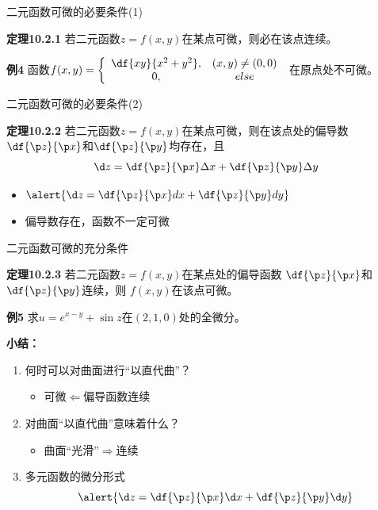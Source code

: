 \begin{frame}{二元函数可微的必要条件(1)}
	\linespread{1.2}
	\begin{block}{{\bf 定理10.2.1}\hfill}
		若二元函数$z=f(x,y)$在某点可微，则必在该点连续。
	\end{block}\pause 
	\begin{exampleblock}{{\bf 例4}\hfill}
		函数$f(x,y)=\left\{\begin{array}{cc}
			\df{xy}{x^2+y^2},& (x,y)\ne (0,0)\\
			0, & else
		\end{array}\right.$
		在原点处不可微。
	\end{exampleblock}
\end{frame}

\begin{frame}{二元函数可微的必要条件(2)}
	\linespread{1.2}
	\begin{block}{{\bf 定理10.2.2}\hfill}
		若二元函数$z=f(x,y)$在某点可微，则在该点处的偏导数
		$\df{\p z}{\p x}$和$\df{\p z}{\p y}$均存在，且
		$$\d z=\df{\p z}{\p x}\Delta x+\df{\p z}{\p y}\Delta y$$
	\end{block}\pause 
	\begin{itemize}
	  \item $\alert{\d z=\df{\p z}{\p x}dx+\df{\p z}{\p y}dy}$\pause 
	  \item 偏导数存在，函数不一定可微
	\end{itemize}
\end{frame}

\begin{frame}{二元函数可微的充分条件}
	\linespread{1.2}
	\begin{block}{{\bf 定理10.2.3}\hfill}
		若二元函数$z=f(x,y)$在某点处的偏导函数
		$\df{\p z}{\p x}$和$\df{\p z}{\p y}$连续，则
		$f(x,y)$在该点可微。
	\end{block}
	\pause \bigskip
\end{frame}

\begin{frame}
	\linespread{1.2}
	\begin{exampleblock}{{\bf 例5}\hfill}
		求$u=e^{x-y}+\sin z$在$(2,1,0)$处的全微分。
	\end{exampleblock}\pause 
	{\bf 小结：}\pause 
	\begin{enumerate}
	  \item 何时可以对曲面进行“以直代曲”？\pause 
	  \begin{itemize}
	    \item \alert{可微$\Leftarrow$偏导函数连续}\pause 
	  \end{itemize}
	  \item 对曲面“以直代曲”意味着什么？\pause 
	  \begin{itemize}
	    \item \alert{曲面“光滑”$\Rightarrow$连续}\pause 
	  \end{itemize}
	  \item 多元函数的微分形式
	  $$\alert{\d z=\df{\p z}{\p x}\d x+\df{\p z}{\p y}\d y}$$
	\end{enumerate}
\end{frame}

